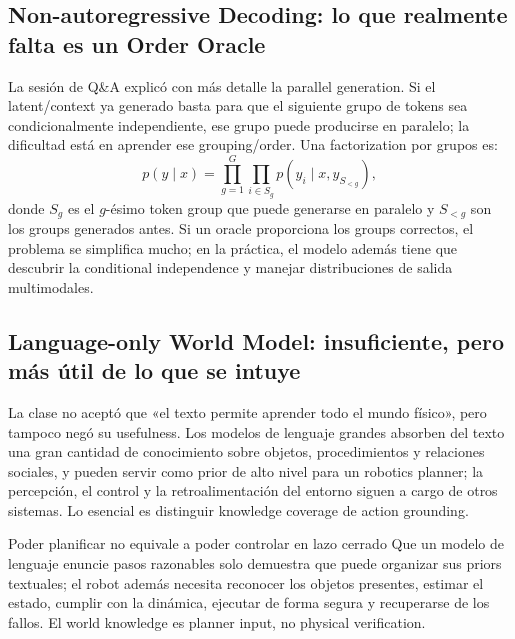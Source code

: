 \subsection{Non-autoregressive Decoding: lo que realmente falta es un Order Oracle}

La sesión de Q\&A explicó con más detalle la parallel generation. Si el latent/context ya generado basta para que el siguiente grupo de tokens sea condicionalmente independiente, ese grupo puede producirse en paralelo; la dificultad está en aprender ese grouping/order. Una factorization por grupos es:
\[
p(y\mid x)=\prod_{g=1}^{G}\prod_{i\in S_g}p\!\left(y_i\mid x,y_{S_{<g}}\right),
\]
donde $S_g$ es el $g$-ésimo token group que puede generarse en paralelo y $S_{<g}$ son los groups generados antes. Si un oracle proporciona los groups correctos, el problema se simplifica mucho; en la práctica, el modelo además tiene que descubrir la conditional independence y manejar distribuciones de salida multimodales.


\subsection{Language-only World Model: insuficiente, pero más útil de lo que se intuye}

La clase no aceptó que «el texto permite aprender todo el mundo físico», pero tampoco negó su usefulness. Los modelos de lenguaje grandes absorben del texto una gran cantidad de conocimiento sobre objetos, procedimientos y relaciones sociales, y pueden servir como prior de alto nivel para un robotics planner; la percepción, el control y la retroalimentación del entorno siguen a cargo de otros sistemas. Lo esencial es distinguir knowledge coverage de action grounding.

\begin{warningbox}{Poder planificar no equivale a poder controlar en lazo cerrado}
Que un modelo de lenguaje enuncie pasos razonables solo demuestra que puede organizar sus priors textuales; el robot además necesita reconocer los objetos presentes, estimar el estado, cumplir con la dinámica, ejecutar de forma segura y recuperarse de los fallos. El world knowledge es planner input, no physical verification.
\end{warningbox}

